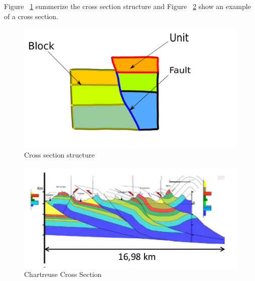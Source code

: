 \documentclass[12pt, a4paper]{report} %
\begin{document}
Figure ~\ref{geostruct} summerize the cross section structure and Figure ~\ref{crossxeg} show an example of a cross section.
 \begin{figure}[H]
	\centering
	\includegraphics[scale=0.3]{geologyStructEdit.png}
	\caption{Cross section structure}
	\label{geostruct}
\end{figure}

\begin{figure}[H]
	\centering
	\includegraphics[scale=0.8]{Wraped_Section.png}
	\caption{Chartreuse Cross Section}
	\label{crossxeg}
\end{figure}
\end{document}
